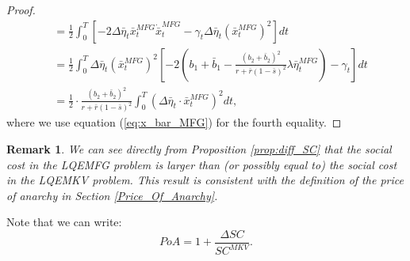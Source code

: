 \documentclass[11pt]{article}
\newtheorem{remark}{Remark}
\begin{document}
\begin{proof}
\begin{equation*}
\begin{split}
			&= \frac{1}{2}\int_0^T \left[- 2\Delta{\bar{\eta}}_t \bar{x}_t^{MFG} \dot{\bar{x}}_t^{MFG} - \gamma_t \Delta{\bar{\eta}}_t (\bar{x}_t^{MFG})^2 \right]dt \\
			&= \frac{1}{2} \int_0^T \Delta{\bar{\eta}}_t (\bar{x}_t^{MFG})^2 \left[-2\left(b_1 + \bar{b}_1 - \frac{(b_2+\bar{b}_2)^2}{r + \bar{r}(1-\bar{s})^2} \lambda \bar{\eta}_t^{MFG}\right) - \gamma_t\right] dt\\
			&= \frac{1}{2}\cdot \frac{(b_2 + \bar{b}_2)^2}{r + \bar{r}(1-\bar{s})^2} \int_0^T (\Delta \bar{\eta}_t \cdot \bar{x}_t^{MFG})^2 dt,
		\end{split}
	\end{equation*}
	where we use equation (\ref{eq:x_bar_MFG}) for the fourth equality.	
	
\end{proof}

\begin{remark}
	We can see directly from Proposition \ref{prop:diff_SC} that the social cost in the LQEMFG problem is larger than (or possibly equal to) the social cost in the LQEMKV problem. This result is consistent with the definition of the price of anarchy in Section \ref{Price_Of_Anarchy}.
\end{remark}

Note that we can write:
\begin{equation}
PoA =1+ \frac{\Delta SC}{SC^{MKV}}.
\label{eq:PoA_LQ}
\end{equation}
\end{document}
